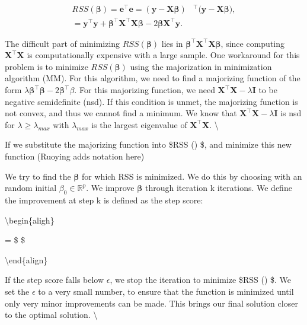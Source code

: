 \documentclass[
]{article}
\begin{document}
\begin{align}
 RSS (\boldsymbol{\beta}) = \mathbf{e}^\top \mathbf{e} = (\mathbf{y-X\boldsymbol{\beta}})&^\top (\mathbf{y-X\boldsymbol{\beta})},
\\
=\mathbf{y}^\top \mathbf{y} + \boldsymbol{\beta}^\top\mathbf{X}^\top\mathbf{X}\boldsymbol{\beta} -2\boldsymbol{\beta}\mathbf{X}^\top \mathbf{y}.
\end{align}

The difficult part of minimizing \(RSS (\boldsymbol{\beta})\) lies in
\(\boldsymbol{\beta}^\top\mathbf{X}^\top\mathbf{X}\boldsymbol{\beta}\),
since computing \(\mathbf{X}^\top\mathbf{X}\) is computationally
expensive with a large sample. One workaround for this problem is to
minimize \(RSS (\boldsymbol{\beta})\) using the majorization in
minimization algorithm (MM). For this algorithm, we need to find a
majorizing function of the form
\(\lambda\boldsymbol{\beta}^\top\boldsymbol{\beta} - 2\boldsymbol{\beta}^\top\beta\).
For this majorizing function, we need
\(\mathbf{X}^\top\mathbf{X}-\lambda\mathbf{I}\) to be negative
semidefinite (nsd). If this condition is unmet, the majorizing function
is not convex, and thus we cannot find a minimum. We know that
\(\mathbf{X}^\top\mathbf{X}-\lambda\mathbf{I}\) is nsd for
\(\lambda\geq\lambda_{max}\) with \(\lambda_{max}\) is the largest
eigenvalue of \(\mathbf{X}^\top\mathbf{X}\). \textbackslash{}

If we substitute the majorizing function into \$RSS (\boldsymbol{\beta})
\$, and minimize this new function (Ruoying adds notation here)

We try to find the \(\boldsymbol{\beta}\) for which RSS is minimized. We
do this by choosing with an random initial \(\beta_0\in\mathbb{R}^p\).
We improve \(\boldsymbol{\beta}\) through iteration k iterations. We
define the improvement at step k is defined as the step score:

\textbackslash begin\{aligh\}

 =
\$
\$

\textbackslash end\{align\}

If the step score falls below \(\epsilon\), we stop the iteration to
minimize \$RSS (\boldsymbol{\beta}) \$. We set the \(\epsilon\) to a
very small number, to ensure that the function is minimized until only
very minor improvements can be made. This brings our final solution
closer to the optimal solution. \textbackslash{}
\end{document}

